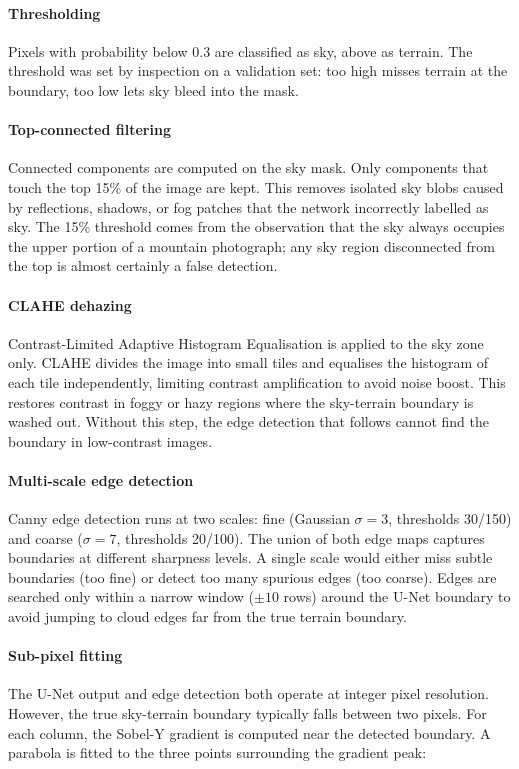 \paragraph{Thresholding} Pixels with probability below 0.3 are classified as sky, above as terrain. The threshold was set by inspection on a validation set: too high misses terrain at the boundary, too low lets sky bleed into the mask.

\paragraph{Top-connected filtering} Connected components are computed on the sky mask. Only components that touch the top 15\% of the image are kept. This removes isolated sky blobs caused by reflections, shadows, or fog patches that the network incorrectly labelled as sky. The 15\% threshold comes from the observation that the sky always occupies the upper portion of a mountain photograph; any sky region disconnected from the top is almost certainly a false detection.

\paragraph{CLAHE dehazing} Contrast-Limited Adaptive Histogram Equalisation is applied to the sky zone only. CLAHE divides the image into small tiles and equalises the histogram of each tile independently, limiting contrast amplification to avoid noise boost. This restores contrast in foggy or hazy regions where the sky-terrain boundary is washed out. Without this step, the edge detection that follows cannot find the boundary in low-contrast images.

\paragraph{Multi-scale edge detection} Canny edge detection runs at two scales: fine (Gaussian $\sigma = 3$, thresholds 30/150) and coarse ($\sigma = 7$, thresholds 20/100). The union of both edge maps captures boundaries at different sharpness levels. A single scale would either miss subtle boundaries (too fine) or detect too many spurious edges (too coarse). Edges are searched only within a narrow window ($\pm 10$ rows) around the U-Net boundary to avoid jumping to cloud edges far from the true terrain boundary.

\paragraph{Sub-pixel fitting} The U-Net output and edge detection both operate at integer pixel resolution. However, the true sky-terrain boundary typically falls between two pixels. For each column, the Sobel-Y gradient is computed near the detected boundary. A parabola is fitted to the three points surrounding the gradient peak:

